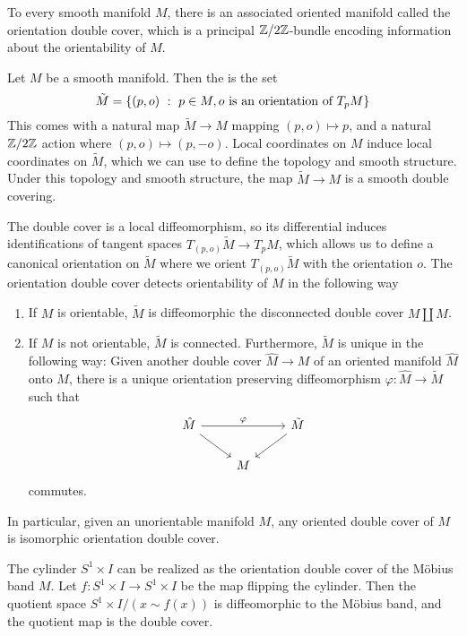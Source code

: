 %
To every smooth manifold $M$, there is an associated oriented manifold called the
orientation double cover, which is a principal $\mathbb{Z}/2\mathbb{Z}$-bundle encoding
information about the orientability of $M$.
%
\begin{defn}
Let $M$ be a smooth manifold. Then the  is the set
\[
\tilde{M} = \left\lbrace (p, o) ~:~ p \in M, o \text{ is an orientation of } T_pM \right\rbrace
\]
This comes with a natural map $\tilde{M} \to M$ mapping $(p,o) \mapsto p$,
and a natural $\mathbb{Z}/2\mathbb{Z}$ action where $(p,o) \mapsto (p,-o)$. Local coordinates
on $M$ induce local coordinates on $\tilde{M}$, which we can use to define the
topology and smooth structure. Under this topology and smooth structure, the
map $\tilde{M} \to M$ is a smooth double covering.
\end{defn}
%
The double cover is a local diffeomorphism, so its differential induces
identifications of tangent spaces $T_{(p,o)}\tilde{M} \to T_pM$, which allows
us to define a canonical orientation on $\tilde{M}$ where we orient
$T_{(p,o)}\tilde{M}$ with the orientation $o$. The orientation double cover
detects orientability of $M$ in the following way
%
\begin{thm} \enumbreak
\begin{enumerate}
  \item If $M$ is orientable, $\tilde{M}$ is diffeomorphic the disconnected
  double cover $M \coprod M$.
  \item If $M$ is not orientable, $\tilde{M}$ is connected. Furthermore,
  $\tilde{M}$ is unique in the following way: Given another double cover
  $\hat{M} \to M$ of an oriented manifold $\hat{M}$ onto $M$, there is a unique
  orientation preserving diffeomorphism $\varphi : \hat{M} \to \tilde{M}$ such
  that
  \[\begin{tikzcd}
  \hat{M} \ar[dr]\ar[rr, "\varphi"] && \tilde{M}\ar[dl] \\
   & M
  \end{tikzcd}\]
  commutes.
\end{enumerate}
\end{thm}
%
In particular, given an unorientable manifold $M$, any oriented double
cover of $M$ is isomorphic orientation double cover.
%
\begin{exmp}
The cylinder $S^1 \times I$ can be realized as the orientation double
cover of the M\"obius band $M$. Let $f : S^1 \times I \to S^1 \times I$ be the
map flipping the cylinder. Then the quotient space $S^1 \times I / (x \sim f(x))$
is diffeomorphic to the M\"obius band, and the quotient map is the double cover.
\end{exmp}
